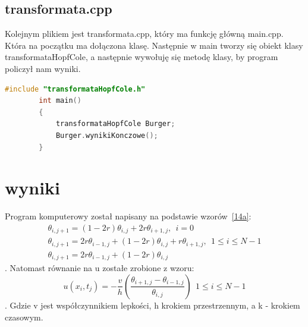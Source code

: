 \documentclass[a4paper,12pt]{article}
\begin{document}
	\subsection{transformata.cpp}
	Kolejnym plikiem jest transformata.cpp, który ma funkcję główną main.cpp. Która na początku ma dołączona klasę. Następnie w main tworzy się obiekt klasy transformataHopfCole, a następnie wywołuję się metodę klasy, by program policzył nam wyniki. 
	\begin{lstlisting}[caption={transformata.cpp},label={transformata}, language=C++]
		#include "transformataHopfCole.h"
		int main()
		{
			transformataHopfCole Burger;
			Burger.wynikiKonczowe();
		}
	\end{lstlisting}
	\section{wyniki}
	Program komputerowy został napisany na podstawie wzorów~\ref{14a}:
	\begin{equation}
		\label{14a}
		\begin{split}
			\theta_{i,j+1}=(1-2r)\theta_{i,j}+2r\theta_{i+1,j}, \ \ i=0\\
			\theta_{i,j+1}=2r\theta_{i-1,j}+(1-2r)\theta_{i,j}+r\theta_{i+1,j}, \ \ 1\le i\le N-1\\
			\theta_{i,j+1}=2r\theta_{i-1,j}+(1-2r)\theta_{i,j}
		\end{split}
	\end{equation}.
	Natomast równanie na u zostałe zrobione z wzoru:
	\begin{equation}
		u(x_i,t_j)=-\frac{v}{h}\left(\frac{\theta_{i+1,j}-\theta_{i-1,j}}{\theta_{i,j}}\right)\ \ 1\le i\le N-1
	\end{equation}.
	Gdzie v jest współczynnikiem lepkości, h krokiem przestrzennym, a k - krokiem czasowym.
	
\end{document}
